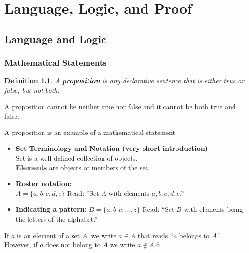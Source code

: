\documentclass[10pt,reqno]{book}
\title{\myfont{Foundations of Mathematics}}
\author{Lukas Zamora}
\date{April 11, 2018}
\theoremstyle{plain}
\newtheorem{definition}[theorem]{Definition}
\begin{document}
	
	\maketitle
	
	\tableofcontents
	
	
	
	\chapter{Language, Logic, and Proof}
	
	\section{Language and Logic}
	
	\subsection*{Mathematical Statements}
	
	\begin{definition}
		A \textbf{\textit{proposition}} is any declarative sentence that is either true or false, but not both.
	\end{definition}
	
	A proposition cannot be neither true nor false and it cannot be both true and false.
	
	A proposition is an example of a mathematical statement.
	
	\begin{itemize}
		\item \textbf{Set Terminology and Notation (very short introduction)}\\ Set is a well-defined collection of objects.\\ \textbf{Elements} are objects or members of the set.
		
		\item \textbf{Roster notation:}\\
			$ A = \{ a,b,c,d,e \} $ Read: ``Set $ A $ with elements $ a,b,c,d,e $.''
		
		\item \textbf{Indicating a pattern:}
			$ B = \{a,b,c,\dots, z\} $ Read: ``Set $ B $ with elements being the letters of the alphabet.''
	\end{itemize}
	If $ a $ is an element of a set $ A $, we write $ a \in A $ that reads ``$ a $ belongs to $ A $.'' However, if $ a $ does not belong to $ A $ we write $ a \notin A $.6
	
\end{document}
